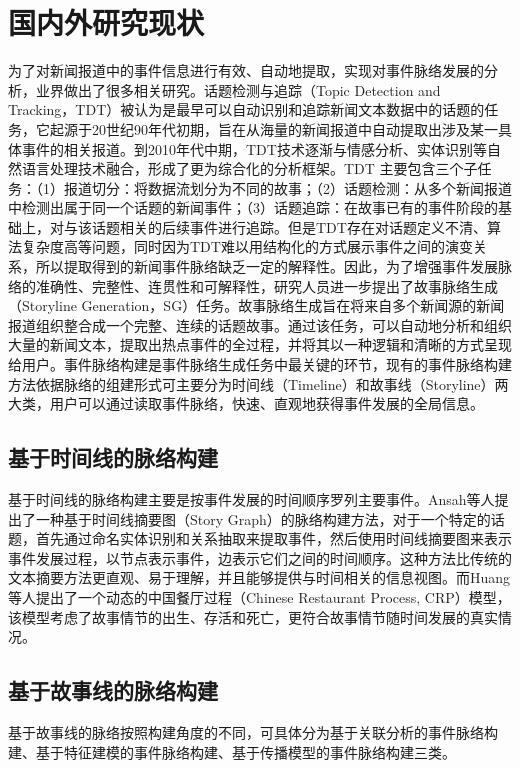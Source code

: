 \section{国内外研究现状}

为了对新闻报道中的事件信息进行有效、自动地提取，实现对事件脉络发展的分析，业界做出了很多相关研究。话题检测与追踪（Topic Detection and Tracking，TDT）被认为是最早可以自动识别和追踪新闻文本数据中的话题的任务，它起源于20世纪90年代初期，旨在从海量的新闻报道中自动提取出涉及某一具体事件的相关报道\cite{TDT}。到2010年代中期，TDT技术逐渐与情感分析、实体识别等自然语言处理技术融合，形成了更为综合化的分析框架。TDT 主要包含三个子任务：（1）报道切分：将数据流划分为不同的故事；（2）话题检测：从多个新闻报道中检测出属于同一个话题的新闻事件；（3）话题追踪：在故事已有的事件阶段的基础上，对与该话题相关的后续事件进行追踪。但是TDT存在对话题定义不清、算法复杂度高等问题，同时因为TDT难以用结构化的方式展示事件之间的演变关系，所以提取得到的新闻事件脉络缺乏一定的解释性\cite{TDT-disad}。因此，为了增强事件发展脉络的准确性、完整性、连贯性和可解释性，研究人员进一步提出了故事脉络生成（Storyline Generation，SG）任务\cite{SG}。故事脉络生成旨在将来自多个新闻源的新闻报道组织整合成一个完整、连续的话题故事。通过该任务，可以自动地分析和组织大量的新闻文本，提取出热点事件的全过程，并将其以一种逻辑和清晰的方式呈现给用户。事件脉络构建是事件脉络生成任务中最关键的环节，现有的事件脉络构建方法依据脉络的组建形式可主要分为时间线（Timeline）和故事线（Storyline）两大类，用户可以通过读取事件脉络，快速、直观地获得事件发展的全局信息。


\subsection{基于时间线的脉络构建}
基于时间线的脉络构建主要是按事件发展的时间顺序罗列主要事件。Ansah等人\cite{Ansah}提出了一种基于时间线摘要图（Story Graph）的脉络构建方法，对于一个特定的话题，首先通过命名实体识别和关系抽取来提取事件，然后使用时间线摘要图来表示事件发展过程，以节点表示事件，边表示它们之间的时间顺序。这种方法比传统的文本摘要方法更直观、易于理解，并且能够提供与时间相关的信息视图。而Huang等人\cite{CRP}提出了一个动态的中国餐厅过程（Chinese Restaurant Process, CRP）模型，该模型考虑了故事情节的出生、存活和死亡，更符合故事情节随时间发展的真实情况。

\subsection{基于故事线的脉络构建}
基于故事线的脉络按照构建角度的不同，可具体分为基于关联分析的事件脉络构建、基于特征建模的事件脉络构建、基于传播模型的事件脉络构建三类\cite{model-category}。

